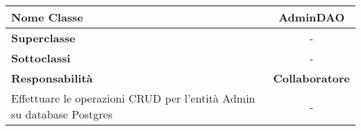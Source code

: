 
\setcounter{table}{0}
\begin{table}[H]
    \centering
    \begin{tabular}{||   l  ||  c   ||}
        \rowcolor{Gray}
        \hline
        \textbf{Nome Classe} & AdminDAO\\
        \hline
        \textbf{Superclasse}  &  - \\
        \hline
        \textbf{Sottoclassi} & - \\
        \hline
        \hline
         \textbf{Responsabilità} & \textbf{Collaboratore} \\
         \hline
          Effettuare le operazioni \gls{CRUD} per l'entità Admin su database Postgres & - \\
         \hline
    \end{tabular}
    
\end{table}

    
       
